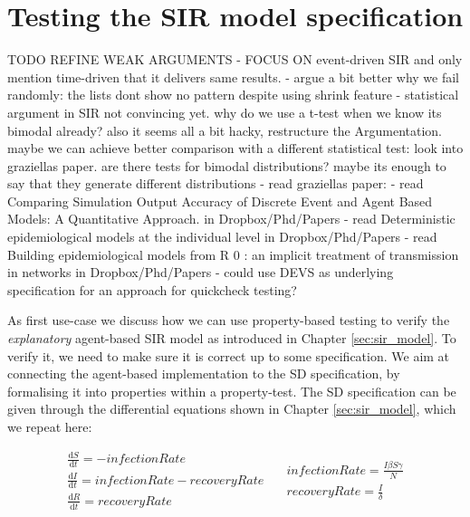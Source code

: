 \chapter{Testing the SIR model specification}
\label{ch:prop_explanatory}

TODO REFINE WEAK ARGUMENTS
- FOCUS ON event-driven SIR and only mention time-driven that it delivers same results.
- argue a bit better why we fail randomly: the lists dont show no pattern despite using shrink feature
- statistical argument in SIR not convincing yet. why do we use a t-test when we know its bimodal already? also it seems all a bit hacky, restructure the Argumentation. maybe we can achieve better comparison with a different statistical test: look into graziellas paper. are there tests for bimodal distributions? maybe its enough to say that they generate different distributions
- read graziellas paper: \cite{figueredo_comparing_2014}
- read Comparing Simulation Output Accuracy of Discrete Event and Agent Based Models: A Quantitative Approach. in Dropbox/Phd/Papers
- read Deterministic epidemiological models at the individual level in Dropbox/Phd/Papers
- read Building epidemiological models from R 0 : an implicit treatment of transmission in networks in Dropbox/Phd/Papers
- could use DEVS as underlying specification for an approach for quickcheck testing?

As first use-case we discuss how we can use property-based testing to verify the \textit{explanatory} agent-based SIR model as introduced in Chapter \ref{sec:sir_model}. To verify it, we need to make sure it is correct up to some specification. We aim at connecting the agent-based implementation to the SD specification, by formalising it into properties within a property-test. The SD specification can be given through the differential equations shown in Chapter \ref{sec:sir_model}, which we repeat here:

\begin{equation}
\begin{split}
\frac{\mathrm d S}{\mathrm d t} = -infectionRate \\
\frac{\mathrm d I}{\mathrm d t} = infectionRate - recoveryRate \\
\frac{\mathrm d R}{\mathrm d t} = recoveryRate 
\end{split}
\quad
\begin{split}
infectionRate = \frac{I \beta S \gamma}{N} \\
recoveryRate = \frac{I}{\delta} 
\end{split}
\end{equation}
\label{eq:sir_delta_rates}

